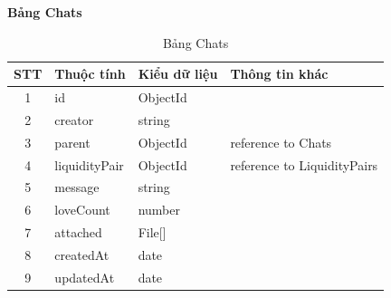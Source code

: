 \clearpage
\hspace{-1cm}\textbf{Bảng Chats}
\begin{table}[H]
    \centering
    \begin{tabular}{|c|l|l|l|}
        \hline
        STT & Thuộc tính    & Kiểu dữ liệu & Thông tin khác              \\
        \hline
        1   & id            & ObjectId     &                             \\
        \hline
        2   & creator       & string       &                             \\
        \hline
        3   & parent        & ObjectId     & reference to Chats          \\
        \hline
        4   & liquidityPair & ObjectId     & reference to LiquidityPairs \\
        \hline
        5   & message       & string       &                             \\
        \hline
        6   & loveCount     & number       &                             \\
        \hline
        7   & attached      & File[]       &                             \\
        \hline
        8   & createdAt     & date         &                             \\
        \hline
        9   & updatedAt     & date         &                             \\
        \hline
    \end{tabular}
    \caption{Bảng Chats}
    \label{tab:chats}
\end{table}

